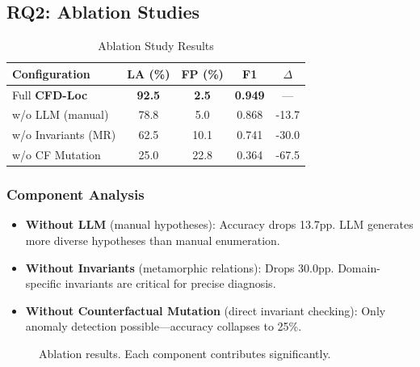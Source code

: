 \documentclass[conference]{IEEEtran}
\theoremstyle{plain}
\newcommand{\methodname}{\textbf{CFD-Loc}}
\begin{document}
\subsection{RQ2: Ablation Studies}
\begin{table}[h]
\centering
\caption{Ablation Study Results}
\label{tab:ablation}
\begin{tabular}{lcccc}
\toprule
\textbf{Configuration} & \textbf{LA (\%)} & \textbf{FP (\%)} & \textbf{F1} & $\Delta$\\\midrule
Full \methodname & \textbf{92.5} & \textbf{2.5} & \textbf{0.949} & ---\\
w/o LLM (manual) & 78.8 & 5.0 & 0.868 & -13.7\\
w/o Invariants (MR) & 62.5 & 10.1 & 0.741 & -30.0\\
w/o CF Mutation & 25.0 & 22.8 & 0.364 & -67.5\\
\bottomrule
\end{tabular}
\end{table}

\subsubsection{Component Analysis}
\begin{itemize}[nosep]
    \item \textbf{Without LLM} (manual hypotheses): Accuracy drops 13.7pp. LLM generates more diverse hypotheses than manual enumeration.
    \item \textbf{Without Invariants} (metamorphic relations): Drops 30.0pp. Domain-specific invariants are critical for precise diagnosis.
    \item \textbf{Without Counterfactual Mutation} (direct invariant checking): Only anomaly detection possible---accuracy collapses to 25\%.
\end{itemize}

\begin{figure}[h]
\centering
{}
\caption{Ablation results. Each component contributes significantly.}
\label{fig:ablation}
\end{figure}
\end{document}
